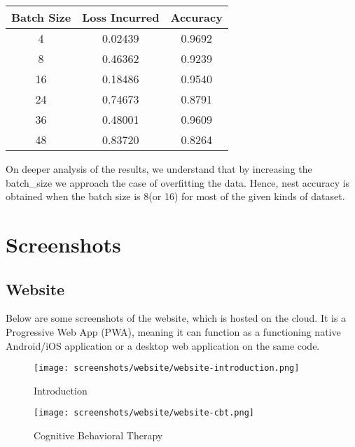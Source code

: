 \begin{center}
    \begin{tabular}{ |c|c|c| } 
        \hline
        Batch Size & Loss Incurred & Accuracy \\ [0.5ex]
        \hline\hline
        4 & 0.02439 & 0.9692 \\
        8 & 0.46362 & 0.9239 \\
        16 & 0.18486 & 0.9540 \\
        24 & 0.74673 & 0.8791 \\
        36 & 0.48001 & 0.9609 \\
        48 & 0.83720 & 0.8264 \\
        \hline
    \end{tabular}
    \label{tbl:nicetablelesstable}
\end{center}

On deeper analysis of the results, we understand that by increasing the batch\_size we approach the case of overfitting the data. Hence, nest accuracy is obtained when the batch size is 8(or 16) for most of the given kinds of dataset.

\pagebreak

\section{Screenshots}

\subsection{Website}

\noindent
Below are some screenshots of the website, which is hosted on the cloud. It is a Progressive Web App (PWA), meaning it can function as a functioning native Android/iOS application or a desktop web application on the same code.

\vspace*{\fill}
\begin{figure}[H]
    \centering
    \texttt{[image: screenshots/website/website-introduction.png]}
    \caption{Introduction}
\end{figure}
\vspace*{\fill}

\pagebreak

\vspace*{\fill}
\begin{figure}[H]
    \centering
    \texttt{[image: screenshots/website/website-cbt.png]}
    \caption{Cognitive Behavioral Therapy}
\end{figure}

